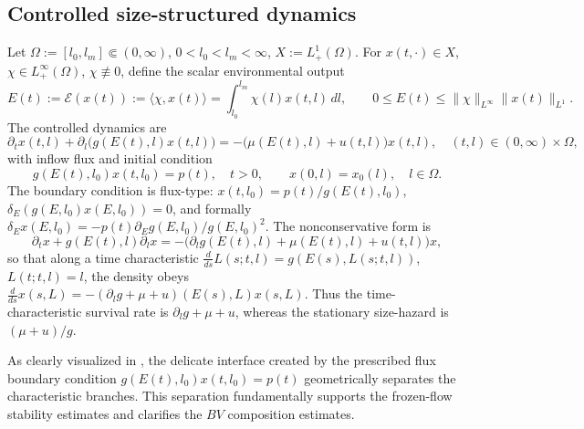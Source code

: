 \documentclass[a4paper,fleqn,longmktitle]{cas-sc}
\theoremstyle{plain}
\theoremstyle{definition}
\theoremstyle{remark}
\numberwithin{equation}{section}
\begin{document}
\subsection{Controlled size-structured dynamics}
\label{subsec:model_dynamics}
Let \(\Omega:=[l_0,l_m]\Subset(0,\infty)\), \(0<l_0<l_m<\infty\),
\(X:=L^1_+(\Omega)\). For \(x(t,\cdot)\in X\), \(\chi\in L^\infty_+(\Omega)\),
\(\chi\not\equiv0\), define the scalar environmental output
\[
    E(t):=\mathcal E(x(t))
    :=
    \langle\chi,x(t)\rangle
    =
    \int_{l_0}^{l_m}\chi(l)x(t,l)\,dl,
    \qquad
    0\le E(t)\le \|\chi\|_{L^\infty}\|x(t)\|_{L^1}.
\]
The controlled dynamics are
\begin{equation}
    \label{eq:model_state}
    \partial_t x(t,l)
    +
    \partial_l\!\big(g(E(t),l)x(t,l)\big)
    =
    -\big(\mu(E(t),l)+u(t,l)\big)x(t,l),
    \quad
    (t,l)\in(0,\infty)\times\Omega,
\end{equation}
with inflow flux and initial condition
\begin{equation}
    \label{eq:model_flux_bc}
    g(E(t),l_0)x(t,l_0)=p(t),\quad t>0,
    \qquad
    x(0,l)=x_0(l),\quad l\in\Omega.
\end{equation}
The boundary condition is flux-type: \(x(t,l_0)=p(t)/g(E(t),l_0)\),
\(\delta_E(g(E,l_0)x(E,l_0))=0\), and formally
\(\delta_E x(E,l_0)=-p(t)\partial_Eg(E,l_0)/g(E,l_0)^2\).
The nonconservative form is
\[
    \partial_t x
    +
    g(E(t),l)\partial_lx
    =
    -\big(\partial_lg(E(t),l)+\mu(E(t),l)+u(t,l)\big)x,
\]
so that along a time characteristic
\(\frac{d}{ds}L(s;t,l)=g(E(s),L(s;t,l))\), \(L(t;t,l)=l\), the density obeys
\(\frac{d}{ds}x(s,L)=-(\partial_lg+\mu+u)(E(s),L)x(s,L)\). Thus the
time-characteristic survival rate is \(\partial_lg+\mu+u\), whereas the
stationary size-hazard is \((\mu+u)/g\).

As clearly visualized in , the delicate interface created by the prescribed flux boundary condition $g(E(t), l_0)x(t, l_0) = p(t)$ geometrically separates the characteristic branches. This separation fundamentally supports the frozen-flow stability estimates and clarifies the $BV$ composition estimates.
\end{document}
